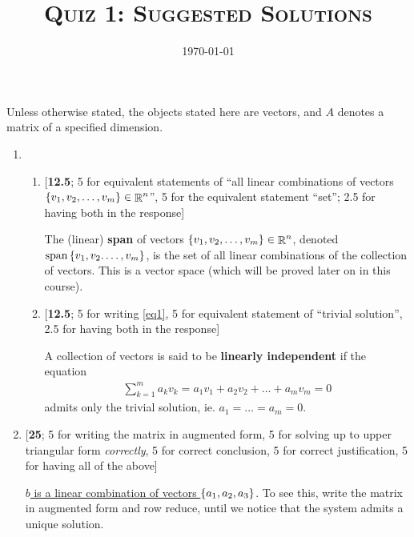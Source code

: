 \documentclass{amsart}
\title{\textsc{Quiz 1: Suggested Solutions}}
\date{\today}
\theoremstyle{definition}
\theoremstyle{definition}
\DeclareMathOperator{\R}{\mathbb{R}}
\DeclareMathOperator{\1}{\mathbbm{1}}
\DeclareMathOperator{\Span}{span}
\begin{document}
\sloppy
\maketitle

Unless otherwise stated, the objects stated here are vectors, and $A$ denotes a matrix of a specified dimension.

\bigskip

\begin{enumerate}
	\item \begin{enumerate}
		\item \phantom{} [\textbf{12.5}; 5 for equivalent statements of ``all linear combinations of vectors $\set{v_1,v_2,\dots,v_m} \in \R^n$'', 5 for the equivalent statement ``set''; 2.5 for having both in the response]
		
		\bigskip
		
		The (linear) \textbf{span} of vectors $\set{v_1,v_2,\dots,v_m} \in \R^n$, denoted $\Span \set{v_1,v_2.\dots,v_m}$, is the set of all linear combinations of the collection of vectors. This is a vector space (which will be proved later on in this course).
		
		
		\item \phantom{} [\textbf{12.5}; 5 for writing \eqref{eq1}, 5 for equivalent statement of ``trivial solution'', 2.5 for having both in the response]
		
		\bigskip
		
		A collection of vectors is said to be \textbf{linearly independent} if the equation
		\begin{align}
		\label{eq1}
		\tag{$\star$}
		\sum_{k=1}^{m} a_k v_k = a_1 v_1 + a_2 v_2 + \dots + a_m v_m = 0
		\end{align}
		admits only the trivial solution, ie. $a_1 = \dots = a_m = 0$.
	\end{enumerate}


	\item \phantom{} [\textbf{25}; 5 for writing the matrix in augmented form, 5 for solving up to upper triangular form \textit{correctly}, 5 for correct conclusion, 5 for correct justification, 5 for having all of the above]
	
	\bigskip
	
	\uline{$b$ is a linear combination of vectors $\set{a_1,a_2,a_3}$}. To see this, write the matrix in augmented form and row reduce, until we notice that the system admits a unique solution.
	

\end{enumerate}
\end{document}
